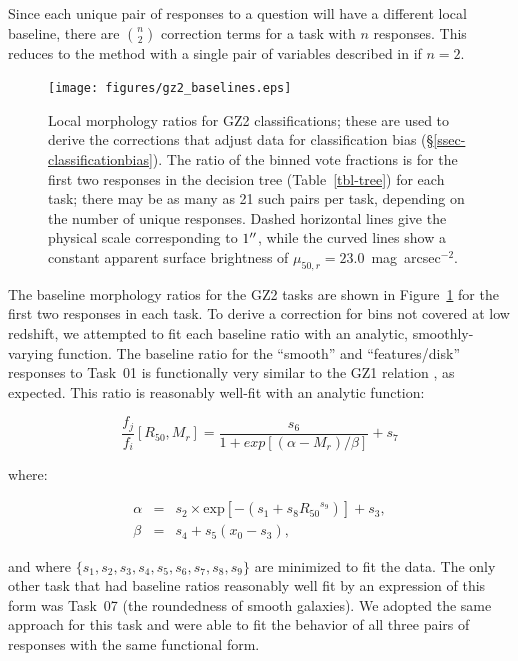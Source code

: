 \documentclass[useAMS,usenatbib]{mn2e}
\begin{document}
Since each unique pair of responses to a question will have a different local baseline, there are $\binom{n}{2}$ correction terms for a task with $n$ responses. This reduces to the method with a single pair of variables described in \citet{bam09} if $n=2$. 

\begin{figure}
\texttt{[image: figures/gz2\_baselines.eps]}
\caption{Local morphology ratios for GZ2 classifications; these are used to derive the corrections that adjust data for classification bias (\S\ref{ssec-classificationbias}). The ratio of the binned vote fractions is for the first two responses in the decision tree (Table~\ref{tbl-tree}) for each task; there may be as many as 21 such pairs per task, depending on the number of unique responses. Dashed horizontal lines give the physical scale corresponding to $1\hbox{$^{\prime\prime}$}$, while the curved lines show a constant apparent surface brightness of $\mu_{50,r}=23.0$~mag~arcsec$^{-2}$.
\label{fig-baselines}}
\end{figure}

The baseline morphology ratios for the GZ2 tasks are shown in Figure~\ref{fig-baselines} for the first two responses in each task. To derive a correction for bins not covered at low redshift, we attempted to fit each baseline ratio with an analytic, smoothly-varying function. The baseline ratio for the ``smooth'' and ``features/disk'' responses to Task~01 is functionally very similar to the GZ1 relation \citep[Figure~A5 in][]{bam09}, as expected. This ratio is reasonably well-fit with an analytic function: 

\begin{equation}
\frac{f_j}{f_i}[R_{50},M_r] = \frac{s_6}{1 + exp[(\alpha - M_r)/\beta]} + s_7
\label{eqn-sb}
\end{equation}

\noindent where:

\begin{eqnarray}
\alpha &=& s_2\times\text{exp}[{-\left(s_1 + s_8{R_{50}}^{s_9}\right)}] + s_3, \\
\beta  &=& s_4 + s_5(x_0 - s_3),
\end{eqnarray}

\noindent and where $\{s_1,s_2,s_3,s_4,s_5,s_6,s_7,s_8,s_9\}$ are minimized to fit the data. The only other task that had baseline ratios reasonably well fit by an expression of this form was Task~07 (the roundedness of smooth galaxies). We adopted the same approach for this task and were able to fit the behavior of all three pairs of responses with the same functional form. 
\end{document}
